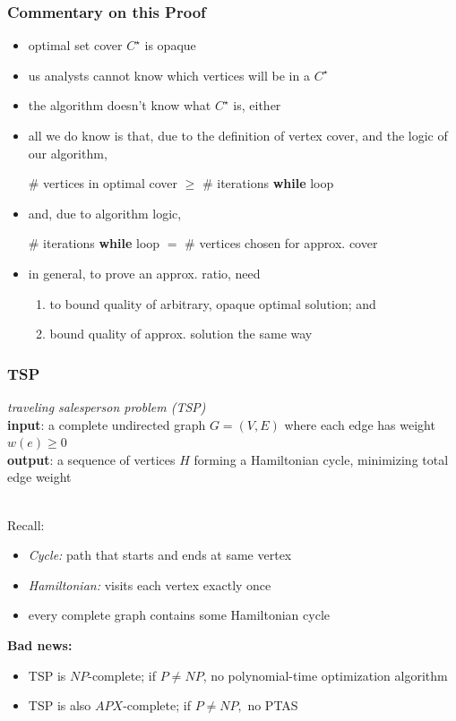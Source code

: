 \documentclass[10pt,aspectratio=169]{beamer}
\newcommand{\stanza}{ \\~\ }
\begin{document}
\begin{frame} \frametitle{Commentary on this Proof}
\begin{itemize}
  \item optimal set cover $C^\star$ is opaque
  \item us analysts cannot know which vertices will be in a $C^\star$
  \item the algorithm doesn't know what $C^\star$ is, either
  \item all we do know is that, due to the definition of vertex cover, and
    the logic of our algorithm,
    \begin{center}
      \# vertices in optimal cover $\geq$ \# iterations \textbf{while} loop
    \end{center}
  \item and, due to algorithm logic,
  \begin{center}
      \# iterations \textbf{while} loop $=$ \# vertices chosen for approx. cover
  \end{center}
  \item in general, to prove an approx. ratio, need
  \begin{enumerate}
    \item to bound quality of arbitrary, opaque optimal solution; and
    \item bound quality of approx. solution the same way
  \end{enumerate}
\end{itemize}
\end{frame}

\begin{frame} \frametitle{TSP}
  \emph{traveling salesperson problem (TSP)} \\
  \textbf{input}: a complete undirected graph $G=(V,E)$ where each edge has weight $w(e) \geq 0$ \\
  \textbf{output}: a sequence of vertices $H$ forming a Hamiltonian cycle, minimizing
  total edge weight
  \stanza
  
  Recall:
  \begin{itemize}
    \item \emph{Cycle:} path that starts and ends at same vertex
    \item \emph{Hamiltonian:} visits each vertex exactly once
    \item every complete graph contains some Hamiltonian cycle
  \end{itemize}
  
  \textbf{Bad news:}
  \begin{itemize}
    \item TSP is $NP$-complete; if $P \ne NP$, no polynomial-time optimization algorithm
    \item TSP is also $APX$-complete; if $P \ne NP,$ no PTAS
  \end{itemize}
  \end{frame}
  
\end{document}
